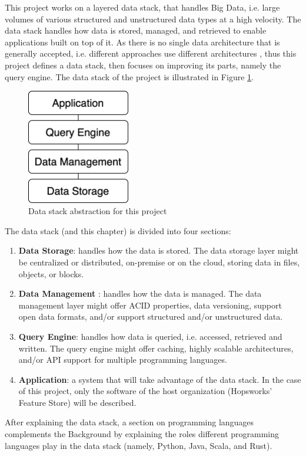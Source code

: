 This project works on a layered data stack, that handles Big Data, i.e. large volumes of various structured and unstructured data types at a high velocity. The data stack handles how data is stored, managed, and retrieved to enable applications built on top of it. 
As there is no single data architecture that is generally accepted, i.e. different approaches use different architectures \cite{framptonCompleteGuideOpen2018,sakrBigDataProcessing2017}, thus this project defines a data stack, then focuses on improving its parts, namely the query engine. The data stack of the project is illustrated in Figure \ref{fig:data_stack}.

\begin{figure}[!ht]
    \begin{center}
      \includegraphics[width=0.4\textwidth]{figures/2-background/data_stack.png}
    \end{center}
    \caption{Data stack abstraction for this project}
    \label{fig:data_stack}
\end{figure}

The data stack (and this chapter) is divided into four sections:
\begin{enumerate}
    \item \textbf{Data Storage}: handles how the data is stored. The data storage layer might be centralized or distributed, on-premise or on the cloud, storing data in files, objects, or blocks.
    \item \textbf{Data Management} : handles how the data is managed. The data management layer might offer \gls{ACID} properties, data versioning, support open data formats, and/or support structured and/or unstructured data.
    \item \textbf{Query Engine}: handles how data is queried, i.e. accessed, retrieved and written. The query engine might offer caching, highly scalable architectures, and/or \gls{API} support for multiple programming languages.
    \item \textbf{Application}: a system that will take advantage of the data stack. In the case of this project, only the software of the host organization (Hopsworks' Feature Store) will be described. 
\end{enumerate}

After explaining the data stack, a section on programming languages complements the Background by explaining the roles different programming languages play in the data stack (namely, Python, Java, Scala, and Rust).
